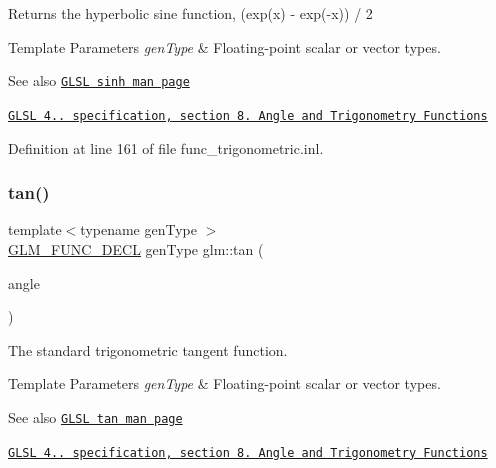 Returns the hyperbolic sine function, (exp(x) -\/ exp(-\/x)) / 2


\begin{DoxyTemplParams}{Template Parameters}
{\em gen\+Type} & Floating-\/point scalar or vector types.\\
\hline
\end{DoxyTemplParams}
\begin{DoxySeeAlso}{See also}
\href{http://www.opengl.org/sdk/docs/manglsl/xhtml/sinh.xml}{\tt G\+L\+SL sinh man page} 

\href{http://www.opengl.org/registry/doc/GLSLangSpec.4.20.8.pdf}{\tt G\+L\+SL 4.. specification, section 8. Angle and Trigonometry Functions} 
\end{DoxySeeAlso}


Definition at line 161 of file func\+\_\+trigonometric.\+inl.

\mbox{\label{group__core__func__trigonometric_ga328aeb0de4f312dc3d200cb929715d44}} 
\subsubsection{\texorpdfstring{tan()}{tan()}}
{\footnotesize\ttfamily template$<$typename gen\+Type $>$ \\
\hyperlink{setup_8hpp_ab2d052de21a70539923e9bcbf6e83a51}{G\+L\+M\+\_\+\+F\+U\+N\+C\+\_\+\+D\+E\+CL} gen\+Type glm\+::tan (\begin{DoxyParamCaption}\item[{gen\+Type const \&}]{angle }\end{DoxyParamCaption})}

The standard trigonometric tangent function.


\begin{DoxyTemplParams}{Template Parameters}
{\em gen\+Type} & Floating-\/point scalar or vector types.\\
\hline
\end{DoxyTemplParams}
\begin{DoxySeeAlso}{See also}
\href{http://www.opengl.org/sdk/docs/manglsl/xhtml/tan.xml}{\tt G\+L\+SL tan man page} 

\href{http://www.opengl.org/registry/doc/GLSLangSpec.4.20.8.pdf}{\tt G\+L\+SL 4.. specification, section 8. Angle and Trigonometry Functions} 
\end{DoxySeeAlso}



